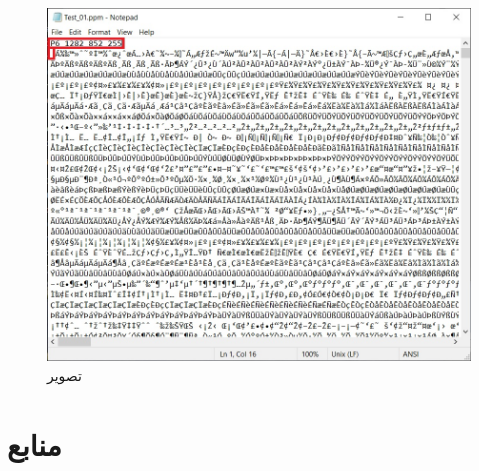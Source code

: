 \documentclass{article}
\begin{document}
\begin{figure}[H]
    \centering
    \includegraphics[width=1\textwidth]{figures/1a.jpg}
    \caption
	{
تصویر
	}
    \label{fig:fig1}
\end{figure}

\begin{latin}

\end{latin}






\section*{منابع}
\renewcommand{\section}[2]{}%
\begin{thebibliography}{99} %


\begin{LTRitems}

\resetlatinfont

\end{LTRitems}

\end{thebibliography}
\end{document}
